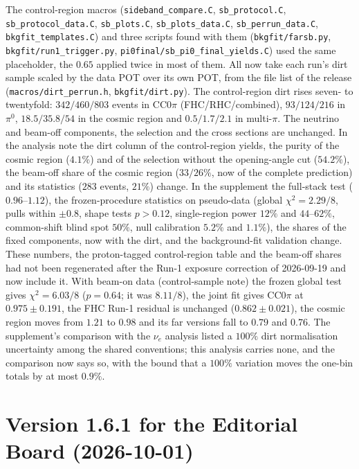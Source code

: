 The control-region macros (\texttt{sideband\_compare.C}, \texttt{sb\_protocol.C}, \texttt{sb\_protocol\_data.C},
\texttt{sb\_plots.C}, \texttt{sb\_plots\_data.C}, \texttt{sb\_perrun\_data.C}, \texttt{bkgfit\_templates.C}) and three
scripts found with them (\texttt{bkgfit/farsb.py}, \texttt{bkgfit/run1\_trigger.py},
\texttt{pi0final/sb\_pi0\_final\_yields.C}) used the same placeholder, the $0.65$ applied twice in most of them.
All now take each run's dirt sample scaled by the data POT over its own POT, from the file list of the release
(\texttt{macros/dirt\_perrun.h}, \texttt{bkgfit/dirt.py}). The control-region dirt rises seven- to twentyfold:
$342/460/803$ events in CC$0\pi$ (FHC/RHC/combined), $93/124/216$ in $\pi^0$, $18.5/35.8/54$ in the cosmic region
and $0.5/1.7/2.1$ in multi-$\pi$. The neutrino and beam-off components, the selection and the cross sections are
unchanged. In the analysis note the dirt column of the control-region yields, the purity of the cosmic region
($4.1\%$) and of the selection without the opening-angle cut ($54.2\%$), the beam-off share of the cosmic region
($33/26\%$, now of the complete prediction) and its statistics ($283$ events, $21\%$) change. In the supplement the
full-stack test ($0.96$--$1.12$), the frozen-procedure statistics on pseudo-data (global $\chi^2=2.29/8$, pulls
within $\pm0.8$, shape tests $p>0.12$, single-region power $12\%$ and $44$--$62\%$, common-shift blind spot $50\%$,
null calibration $5.2\%$ and $1.1\%$), the shares of the fixed components, now with the dirt, and the
background-fit validation change. These numbers, the proton-tagged control-region table and the beam-off shares had
not been regenerated after the Run-1 exposure correction of 2026-09-19 and now include it. With beam-on data
(control-sample note) the frozen global test gives $\chi^2=6.03/8$ ($p=0.64$; it was $8.11/8$), the joint fit
gives CC$0\pi$ at $0.975\pm0.191$, the FHC Run-1 residual is unchanged ($0.862\pm0.021$), the cosmic region
moves from $1.21$ to $0.98$ and its far versions fall to $0.79$ and $0.76$. The supplement's comparison with the
$\nu_e$ analysis listed a $100\%$ dirt normalisation uncertainty among the shared conventions; this analysis
carries none, and the comparison now says so, with the bound that a $100\%$ variation moves the one-bin totals
by at most $0.9\%$.

\section{Version 1.6.1 for the Editorial Board (2026-10-01)}

